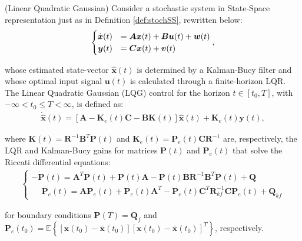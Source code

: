 \documentclass[a4paper,11pt]{book}
\numberwithin{figure}{chapter}
\numberwithin{equation}{chapter}
\numberwithin{table}{chapter}
\theoremstyle{definition}
\newtheorem{definition}{Definition}[chapter]
\newcounter{boxed-theorem}
\newcounter{boxed-lemma}
\newcounter{boxed-definition}
\newenvironment{boxed-definition}[1]
{\colorlet{shadecolor}{pastelYellow!15} \begin{shaded} \begin{definition}{#1}}
{\end{definition} \end{shaded}}
\newcounter{boxed-example}
\begin{document}
\begin{boxed-definition}{(Linear Quadratic Gaussian)} \label{def:lqg}
    Consider a stochastic system in State-Space representation just as in Definition \ref{def:stochSS}, rewritten below:
	\begin{align}
    \begin{cases}
        \hfill \dot{\bm{x}}(t) &= \bm{A} \bm{x}(t) + \bm{B} \bm{u}(t) + \bm{w}(t) \\
        \hfill \bm{y}(t) &= \bm{C} \bm{x}(t) + \bm{v}(t)
    \end{cases}
    ,\end{align}
    
     \noindent whose estimated state-vector $\hat{\bm{x}}(t)$ is determined by a Kalman-Bucy filter and whose optimal input signal $\bm{u}(t)$ is calculated through a finite-horizon LQR. The Linear Quadratic Gaussian (LQG) control for the horizon $t \in [t_0, T]$, with $-\infty < t_0 \leq T < \infty$, is defined as:
    \begin{align} \label{eq:lqg01}
        \dot{\hat{\bm{x}}}(t) = \left[\bm{A} - \bm{K}_e(t) \bm{C} - \bm{B} \bm{K}(t) \right] \hat{\bm{x}}(t) + \bm{K}_e(t) \bm{y}(t) 
    ,\end{align}
    
    \noindent where $\bm{K}(t) = \bm{R}^{-1}\bm{B}^T \bm{P}(t)$ and $\bm{K}_e(t) = \bm{P}_e(t) \bm{C} \bm{R}^{-1}$ are, respectively, the LQR and Kalman-Bucy gains for matrices $\bm{P}(t)$ and $\bm{P}_e(t)$ that solve the Riccati differential equations:
    \begin{align}
    \begin{cases}
        -\dot{\bm{P}}(t) = \bm{A}^T \bm{P}(t) + \bm{P}(t) \bm{A} - \bm{P}(t) \bm{B} \bm{R}^{-1} \bm{B}^T \bm{P}(t) + \bm{Q} \\
        \phantom{-} \dot{\bm{P}_e}(t) = \bm{A} \bm{P}_e(t) + \bm{P}_e(t) \bm{A}^T - \bm{P}_e(t)\bm{C}^T\bm{R}_{kf}^{-1} \bm{C} \bm{P}_e(t) + \bm{Q}_{kf}
    \end{cases}
    \end{align}
    
    \noindent for boundary conditions $\bm{P}(T) = \bm{Q}_f$ and $\bm{P}_e(t_0) = \mathbb{E} \left\{ [\bm{x}(t_0) - \bar{\bm{x}}(t_0)][\bm{x}(t_0) - \bar{\bm{x}}(t_0)]^T \right\}$, respectively.
\end{boxed-definition}
\end{document}
